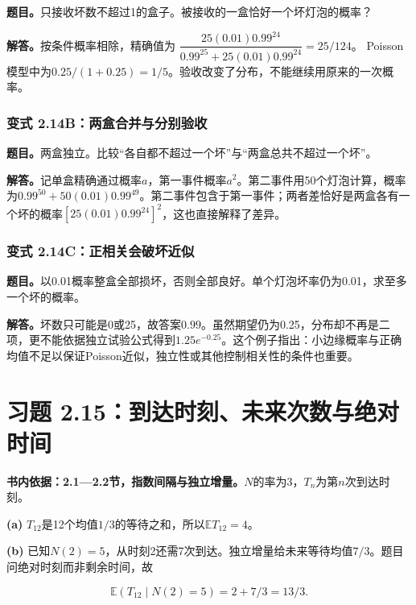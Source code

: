 \documentclass[12pt,a4paper,UTF8,fontset=fandol]{ctexart}
\begin{document}
\textbf{题目。}只接收坏数不超过1的盒子。被接收的一盒恰好一个坏灯泡的概率？

\textbf{解答。}按条件概率相除，精确值为
\(\dfrac{25(0.01)0.99^{24}}{0.99^{25}+25(0.01)0.99^{24}}=\boxed{25/124}\)。
Poisson模型中为\(0.25/(1+0.25)=1/5\)。验收改变了分布，不能继续用原来的一次概率。

\subsubsection{变式
2.14B：两盒合并与分别验收}\label{ux53d8ux5f0f-2.14bux4e24ux76d2ux5408ux5e76ux4e0eux5206ux522bux9a8cux6536}

\textbf{题目。}两盒独立。比较``各自都不超过一个坏''与``两盒总共不超过一个坏''。

\textbf{解答。}记单盒精确通过概率\(a\)，第一事件概率\(a^2\)。第二事件用50个灯泡计算，概率为\(0.99^{50}+50(0.01)0.99^{49}\)。第二事件包含于第一事件；两者差恰好是两盒各有一个坏的概率\([25(0.01)0.99^{24}]^2\)，这也直接解释了差异。

\subsubsection{变式
2.14C：正相关会破坏近似}\label{ux53d8ux5f0f-2.14cux6b63ux76f8ux5173ux4f1aux7834ux574fux8fd1ux4f3c}

\textbf{题目。}以0.01概率整盒全部损坏，否则全部良好。单个灯泡坏率仍为0.01，求至多一个坏的概率。

\textbf{解答。}坏数只可能是0或25，故答案\(0.99\)。虽然期望仍为0.25，分布却不再是二项，更不能依据独立试验公式得到\(1.25e^{-0.25}\)。这个例子指出：小边缘概率与正确均值不足以保证Poisson近似，独立性或其他控制相关性的条件也重要。

\section{习题
2.15：到达时刻、未来次数与绝对时间}\label{ux4e60ux9898-2.15ux5230ux8fbeux65f6ux523bux672aux6765ux6b21ux6570ux4e0eux7eddux5bf9ux65f6ux95f4}

\textbf{书内依据：2.1---2.2节，指数间隔与独立增量。}\(N\)的率为3，\(T_n\)为第\(n\)次到达时刻。

\textbf{(a)}
\(T_{12}\)是12个均值\(1/3\)的等待之和，所以\(\boxed{\mathbb ET_{12}=4}\)。

\textbf{(b)}
已知\(N(2)=5\)，从时刻2还需7次到达。独立增量给未来等待均值\(7/3\)。题目问绝对时刻而非剩余时间，故

\[\boxed{\mathbb E(T_{12}\mid N(2)=5)=2+7/3=13/3.}\]
\end{document}
